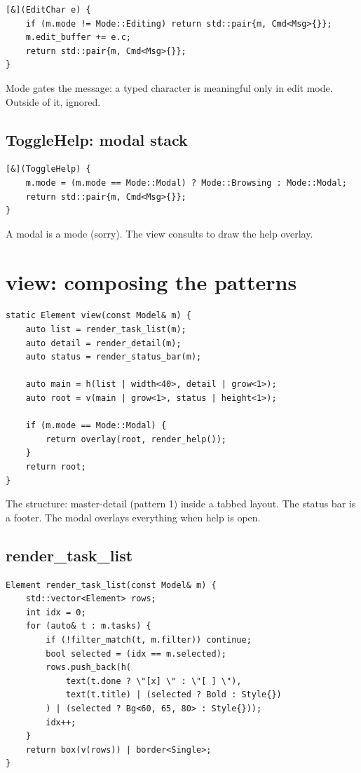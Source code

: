 \begin{lstlisting}
[&](EditChar e) {
    if (m.mode != Mode::Editing) return std::pair{m, Cmd<Msg>{}};
    m.edit_buffer += e.c;
    return std::pair{m, Cmd<Msg>{}};
}
\end{lstlisting}

Mode gates the message: a typed character is meaningful only in
edit mode. Outside of it, ignored.

\subsection*{ToggleHelp: modal stack}

\begin{lstlisting}
[&](ToggleHelp) {
    m.mode = (m.mode == Mode::Modal) ? Mode::Browsing : Mode::Modal;
    return std::pair{m, Cmd<Msg>{}};
}
\end{lstlisting}

A modal is a mode (sorry). The view consults  to
draw the help overlay.

\section{view: composing the patterns}

\begin{lstlisting}
static Element view(const Model& m) {
    auto list = render_task_list(m);
    auto detail = render_detail(m);
    auto status = render_status_bar(m);

    auto main = h(list | width<40>, detail | grow<1>);
    auto root = v(main | grow<1>, status | height<1>);

    if (m.mode == Mode::Modal) {
        return overlay(root, render_help());
    }
    return root;
}
\end{lstlisting}

The structure: master-detail (pattern 1) inside a tabbed layout.
The status bar is a footer. The modal overlays everything when
help is open.

\subsection*{render\_task\_list}

\begin{lstlisting}
Element render_task_list(const Model& m) {
    std::vector<Element> rows;
    int idx = 0;
    for (auto& t : m.tasks) {
        if (!filter_match(t, m.filter)) continue;
        bool selected = (idx == m.selected);
        rows.push_back(h(
            text(t.done ? \"[x] \" : \"[ ] \"),
            text(t.title) | (selected ? Bold : Style{})
        ) | (selected ? Bg<60, 65, 80> : Style{}));
        idx++;
    }
    return box(v(rows)) | border<Single>;
}
\end{lstlisting}

